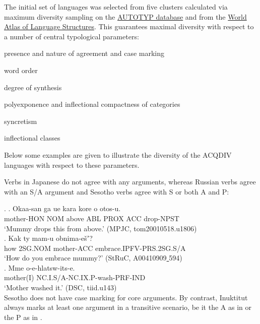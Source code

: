 \documentclass[a4paper, 11pt]{book}
\newcommand{\source}[1]{\hfill (#1)\\[-0.2cm]}	%
\newcommand{\und}{\underline{{ }}\hspace{0.2mm}}	%
\begin{document}
The initial set of languages was selected from five clusters calculated via maximum diversity sampling \citep{Stoll_etal2013a} on the \href{http://www.autotyp.uzh.ch}{AUTOTYP database} and from the \href{http://wals.info}{World Atlas of Language Structures}. This guarantees maximal diversity with respect to a number of central typological parameters: %

\begin{itemize*}
	\item presence and nature of agreement and case marking
	\item word order
	\item degree of synthesis
	\item polyexponence and inflectional compactness of categories
	\item syncretism
	\item inflectional classes
\end{itemize*}

Below some examples are given to illustrate the diversity of the ACQDIV languages with respect to these parameters. 

Verbs in Japanese \Next[a] do not agree with any arguments, whereas Russian verbs \Next[b] agree with an S/A argument and Sesotho verbs \Next[c] agree with S or both A and P:

\ex.
	\ag. Okaa-san ga ue kara kore o otos-u. \\
		mother-HON NOM above ABL PROX ACC drop-NPST \\
		‘Mummy drops this from above.’ \source{MPJC, tom20010518.u1806}
	\bg. Kak ty mam-u obnima-ešʼ? \\
		how 2SG.NOM mother-ACC embrace.IPFV-PRS.2SG.S/A \\
		‘How do you embrace mummy?’ \source{StRuC, A00410909\und 594}
	\cg. Mme o-e-hlatsw-its-e. \\
		mother(I) NC.I.S/A-NC.IX.P-wash-PRF-IND \\
		‘Mother washed it.’ \source{DSC, tiid.u143}

Sesotho \Next[a] does not have case marking for core arguments. By contrast, Inuktitut always marks at least one argument in a transitive scenario, be it the A as in \Next[b] or the P as in \Next[c]. 
\end{document}

